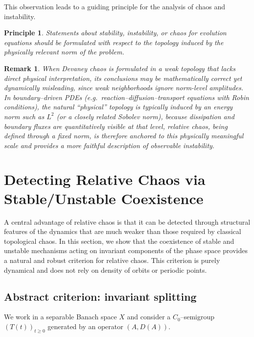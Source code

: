 \documentclass[12pt]{article}
\newtheorem{remark}[theorem]{Remark}
\newtheorem{principle}[theorem]{Principle}
\begin{document}
This observation leads to a guiding principle for the analysis of chaos and instability.

\begin{principle}
Statements about stability, instability, or chaos for evolution equations should be formulated with respect to the topology induced by the physically relevant norm of the problem.
\end{principle}

\begin{remark}
When Devaney chaos is formulated in a weak topology that lacks direct physical interpretation, its conclusions may be mathematically correct yet dynamically misleading, since weak neighborhoods ignore norm-level amplitudes. In boundary--driven PDEs (e.g.\ reaction--diffusion--transport equations with Robin
conditions), the natural ``physical'' topology is typically induced by an energy norm such as $L^2$ (or a closely related Sobolev norm), because dissipation and boundary fluxes are quantitatively visible at that level, relative chaos, being defined through a fixed norm, is therefore anchored to this physically meaningful scale and provides a more faithful description of observable instability.
\end{remark}


\section{Detecting Relative Chaos via Stable/Unstable Coexistence}\label{DRCSUC}

A central advantage of relative chaos is that it can be detected through structural features of the dynamics that are much weaker than those required by classical topological chaos. In this section, we show that the coexistence of stable and unstable mechanisms acting on invariant components of the phase space provides a natural and robust criterion for relative chaos. This criterion is purely dynamical and does not rely on density of orbits or periodic points.

\subsection{Abstract criterion: invariant splitting}

We work in a separable Banach space $X$ and consider a $C_0$--semigroup $(T(t))_{t\ge 0}$ generated by an operator $(A,D(A))$.
\end{document}
